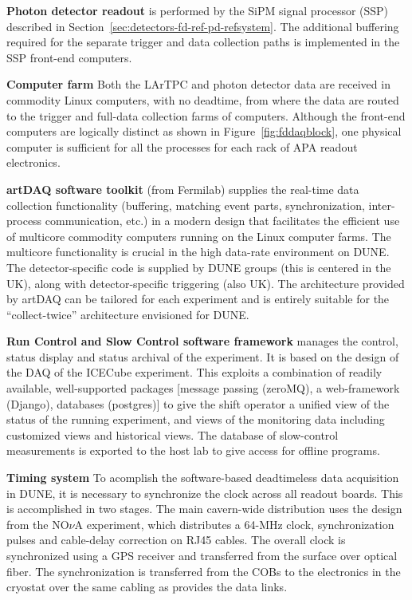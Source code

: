 {\bf Photon detector readout} is performed by the SiPM signal
processor (SSP) described in
Section~\ref{sec:detectors-fd-ref-pd-refsystem}.  The additional
buffering required for the separate trigger and data collection paths
is implemented in the SSP front-end computers.

{\bf Computer farm} Both the LArTPC and photon detector data are
received in commodity Linux computers, with no deadtime, from where
the data are routed to the trigger and full-data collection farms of
computers.  Although the front-end computers are logically distinct as
shown in Figure~\ref{fig:fddaqblock}, one physical computer is
sufficient for all the processes for each rack of APA readout
electronics. 

{\bf artDAQ software toolkit} (from Fermilab) supplies the real-time
data collection functionality (buffering, matching event parts,
synchronization, inter-process communication, etc.) in a modern
design that facilitates the efficient use of multicore commodity
computers running on the Linux computer farms.  The multicore
functionality is crucial in the high data-rate environment on DUNE.  
The detector-specific
code is supplied by DUNE groups (this is centered in the UK), along
with detector-specific triggering (also UK).  The architecture
provided by artDAQ can be tailored for each experiment and is entirely
suitable for the ``collect-twice'' architecture envisioned for DUNE.

{\bf Run Control and Slow Control software framework} manages the
control, status display and status archival of the experiment.  It is
based on the design of the DAQ of the ICECube experiment\cite{Abbasi:2008aa}. This
exploits a combination of readily available, well-supported packages
[message passing (zeroMQ), a web-framework (Django), databases (postgres)] 
to give the shift operator a unified view of the status
of the running experiment, and views of the monitoring data including
customized views and historical views.  The database of slow-control
measurements is exported to the host lab to give access for offline
programs.

{\bf Timing system} To acomplish the software-based deadtimeless data
acquisition in DUNE, it is necessary to synchronize the clock across
all readout boards.  This is accomplished in two stages. The main
cavern-wide distribution uses the design from the NO$\nu$A experiment,
which distributes a 64-MHz clock, synchronization pulses and
cable-delay correction on RJ45 cables.  The overall clock is
synchronized using a GPS receiver and transferred from the surface
over optical fiber.  The synchronization is transferred from the COBs
to the electronics in the cryostat over the same cabling as provides
the data links.

